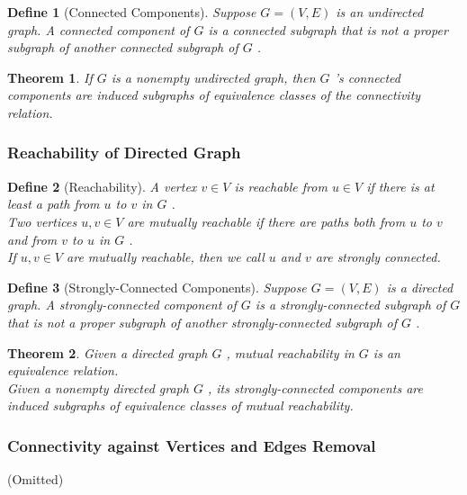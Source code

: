 \documentclass{ctexart}
\newcommand{\。}{．} %
\newenvironment{lvse}{
    \begin{tcolorbox}[enhanced, breakable, colback=qlv, boxrule=0pt, frame hidden,
        borderline west={0.7mm}{0.1mm}{slv}]
    }
    {\end{tcolorbox}}
\newenvironment{huangse}{
    \begin{tcolorbox}[enhanced, breakable, colback=qhuang, boxrule=0pt, frame hidden,
        borderline west={0.7mm}{0.1mm}{shuang}]
    }
    {\end{tcolorbox}}
\theoremstyle{t} %
\newtheorem{dyhj}{\color{slv} Define}[subsection] %
\newtheorem{dlhj}{\color{shuang} Theorem}[subsection]
\newenvironment{dy}{\begin{lvse}\begin{dyhj}}{\end{dyhj}\end{lvse}}
\newenvironment{dl}{\begin{huangse}\begin{dlhj}}{\end{dlhj}\end{huangse}}
\begin{document}
\begin{dy}[Connected Components]
    Suppose  $ G = (V, E) $  is an undirected graph. A connected component of  $ G $  is a connected subgraph that is not a proper subgraph of another connected subgraph of  $ G $ .
\end{dy}

\begin{dl}
    If  $ G $  is a nonempty undirected graph, then  $ G $ 's connected components are induced subgraphs of equivalence classes of the connectivity relation.
\end{dl}

\subsubsection{Reachability of Directed Graph}

\begin{dy}[Reachability]
    A vertex  $ v \in V $  is reachable from  $ u \in V $  if there is at least a path from  $ u $  to  $ v $  in  $ G $ . \\
    Two vertices  $ u, v \in V $  are mutually reachable if there are paths both from  $ u $  to  $ v $  and from  $ v $  to  $ u $  in  $ G $ . \\
    If $u, v \in V$ are mutually reachable, then we call $u$ and $v$ are strongly connected.
\end{dy}

\begin{dy}[Strongly-Connected Components]
    Suppose  $ G = (V, E) $  is a directed graph. A strongly-connected component of  $ G $  is a strongly-connected subgraph of  $ G $  that is not a proper subgraph of another strongly-connected subgraph of  $ G $ .
\end{dy}

\begin{dl}
    Given a directed graph  $ G $ , mutual reachability in  $ G $  is an equivalence relation. \\
    Given a nonempty directed graph  $ G $ , its strongly-connected components are induced subgraphs of equivalence classes of mutual reachability.
\end{dl}

\subsubsection{Connectivity against Vertices and Edges Removal}

(Omitted)
\end{document}
